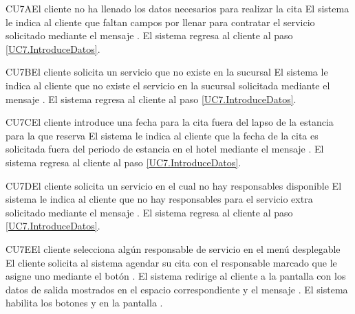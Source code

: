 \begin{UCtrayectoriaA}{CU7}{A}{El cliente no ha llenado los datos necesarios para realizar la cita}
	\UCpaso El sistema le indica al cliente que faltan campos por llenar para contratar el servicio solicitado mediante el mensaje .
	\UCpaso El sistema regresa al cliente al paso \ref{UC7.IntroduceDatos}.
\end{UCtrayectoriaA}
\begin{UCtrayectoriaA}{CU7}{B}{El cliente solicita un servicio que no existe en la sucursal}
	\UCpaso El sistema le indica al cliente que no existe el servicio en la sucursal solicitada mediante el mensaje .
	\UCpaso El sistema regresa al cliente al paso \ref{UC7.IntroduceDatos}.
\end{UCtrayectoriaA}
\begin{UCtrayectoriaA}{CU7}{C}{El cliente introduce una fecha para la cita fuera del lapso de la estancia para la que reserva}
	\UCpaso El sistema le indica al cliente que la fecha de la cita es solicitada fuera del periodo de estancia en el hotel mediante el mensaje .
	\UCpaso El sistema regresa al cliente al paso \ref{UC7.IntroduceDatos}.
\end{UCtrayectoriaA}
\begin{UCtrayectoriaA}{CU7}{D}{El cliente solicita un servicio en el cual no hay responsables disponible}
	\UCpaso El sistema le indica al cliente que no hay responsables para el servicio extra solicitado mediante el mensaje .
	\UCpaso El sistema regresa al cliente al paso \ref{UC7.IntroduceDatos}.
\end{UCtrayectoriaA}
\begin{UCtrayectoriaA}{CU7}{E}{El cliente selecciona algún responsable de servicio en el menú desplegable}
	\UCpaso[] El cliente solicita al sistema agendar su cita con el responsable marcado que le asigne uno mediante el botón .
	\UCpaso[] El sistema redirige al cliente a la pantalla  con los datos de salida mostrados en el espacio correspondiente y el mensaje .
	\UCpaso[] El sistema habilita los botones  y  en la pantalla .
\end{UCtrayectoriaA}



